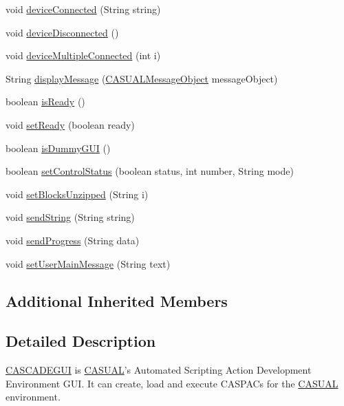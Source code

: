 \begin{DoxyCompactItemize}
\item 
void \hyperlink{class_c_a_s_c_a_d_e_g_u_i_1_1_c_a_s_c_a_d_e_g_u_i_a82d1be792b2be3a60e57fd7dd67a1900}{device\-Connected} (String string)
\item 
void \hyperlink{class_c_a_s_c_a_d_e_g_u_i_1_1_c_a_s_c_a_d_e_g_u_i_a3aed3d6c9d77c7ca52f07137ce41f2a6}{device\-Disconnected} ()
\item 
void \hyperlink{class_c_a_s_c_a_d_e_g_u_i_1_1_c_a_s_c_a_d_e_g_u_i_a7be4ced04beac7bf4439daa7d0ba8e16}{device\-Multiple\-Connected} (int i)
\item 
String \hyperlink{class_c_a_s_c_a_d_e_g_u_i_1_1_c_a_s_c_a_d_e_g_u_i_a5c473f68a3982d7cbd2467138bf96841}{display\-Message} (\hyperlink{class_c_a_s_u_a_l_1_1_c_a_s_u_a_l_message_object}{C\-A\-S\-U\-A\-L\-Message\-Object} message\-Object)
\item 
boolean \hyperlink{class_c_a_s_c_a_d_e_g_u_i_1_1_c_a_s_c_a_d_e_g_u_i_a56e1ebffa4d4907cf21f7f05ea616c90}{is\-Ready} ()
\item 
void \hyperlink{class_c_a_s_c_a_d_e_g_u_i_1_1_c_a_s_c_a_d_e_g_u_i_a09909a84a83102c80963795a4d91e172}{set\-Ready} (boolean ready)
\item 
boolean \hyperlink{class_c_a_s_c_a_d_e_g_u_i_1_1_c_a_s_c_a_d_e_g_u_i_afda936693dffec469219fdb84487b078}{is\-Dummy\-G\-U\-I} ()
\item 
boolean \hyperlink{class_c_a_s_c_a_d_e_g_u_i_1_1_c_a_s_c_a_d_e_g_u_i_aa78d7e0f2e44bf8028911d107d622752}{set\-Control\-Status} (boolean status, int number, String mode)
\item 
void \hyperlink{class_c_a_s_c_a_d_e_g_u_i_1_1_c_a_s_c_a_d_e_g_u_i_ad7ba412931a82f287a8ebed0644cdd65}{set\-Blocks\-Unzipped} (String i)
\item 
void \hyperlink{class_c_a_s_c_a_d_e_g_u_i_1_1_c_a_s_c_a_d_e_g_u_i_a455caf00d2da6474054874500a4f9c35}{send\-String} (String string)
\item 
void \hyperlink{class_c_a_s_c_a_d_e_g_u_i_1_1_c_a_s_c_a_d_e_g_u_i_aa2f74679265d7836d0143aa7356bf31d}{send\-Progress} (String data)
\item 
void \hyperlink{class_c_a_s_c_a_d_e_g_u_i_1_1_c_a_s_c_a_d_e_g_u_i_a8c3f90dcc8455cbb76895d59dedd886c}{set\-User\-Main\-Message} (String text)
\end{DoxyCompactItemize}
\subsection*{Additional Inherited Members}


\subsection{Detailed Description}
\hyperlink{class_c_a_s_c_a_d_e_g_u_i_1_1_c_a_s_c_a_d_e_g_u_i}{C\-A\-S\-C\-A\-D\-E\-G\-U\-I} is \hyperlink{namespace_c_a_s_u_a_l}{C\-A\-S\-U\-A\-L}'s Automated Scripting Action Development Environment G\-U\-I. It can create, load and execute C\-A\-S\-P\-A\-Cs for the \hyperlink{namespace_c_a_s_u_a_l}{C\-A\-S\-U\-A\-L} environment.

